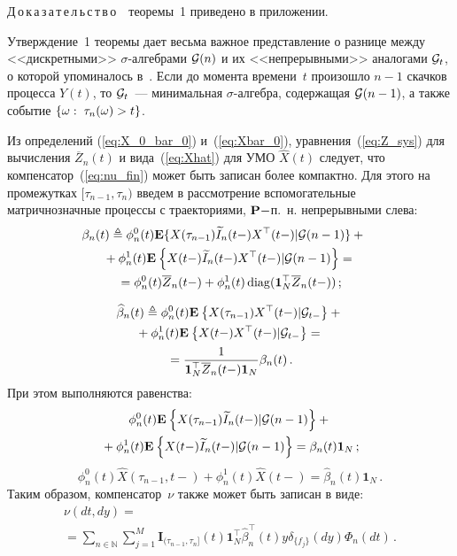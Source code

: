 \begin{multicols}{2}
\noindent
 Д\,о\,к\,а\,з\,а\,т\,е\,л\,ь\,с\,т\,в\,о\ \ теоремы~1 приведено в приложении.

\smallskip

 Утверждение~1 теоремы дает весьма важное пред\-ставление о разнице между
 <<дискретными>> \mbox{$\sigma$-ал}\-геб\-ра\-ми ${\mathcal G}(n)$ и их <<непрерывными>> аналогами
 ${\mathcal G}_t$, о которой упоминалось в~\cite{CLR_06}. Если до момента времени~$t$
 произошло $n-1$ скачков процесса $Y(t)$, то ${\mathcal G}_t$~---
 минимальная $\sigma$-ал\-геб\-ра, содержащая ${\mathcal G}(n-1)$, а также событие
 $\{\omega:\; \tau_n(\omega)\hm>t\}$.

 Из определений (\ref{eq:X_0_bar_0}) и~(\ref{eq:Xbar_0}),
 уравнения~(\ref{eq:Z_sys}) для вычисления $\overline{Z}_n(t)$ и
 вида~(\ref{eq:Xhat}) для УМО $\widehat{X}(t)$ следует, что
 компенсатор~(\ref{eq:nu_fin}) может быть записан более компактно. Для этого
на промежутках $[\tau_{n-1},\tau_n)$ введем в рассмотрение вспомогательные
матричнозначные процессы с траекториями, ${\mathbf P}-$п.~н. непрерывными слева:
 \begin{multline}
 \hspace*{-9pt}\beta_n(t) \triangleq \phi^0_n(t)\mathbf{E}\{X(\tau_{n-1})
 \widetilde{I}_{n}(t-)X^{\top}(t-)|{\mathcal G}(n-1)\}+{}\\
{} +\phi^1_n(t)\mathbf{E}_{  }\left\{ \mathop{X(t-)\widetilde{I}_{n}(t-)X^{\top}(t-)|{\mathcal G}(n-1)} \right\}={} \\
{}=
 \phi^0_n(t)\overline{Z}_n(t-)+\phi^1_n(t)\mathop{\mathrm{diag}}(\mathbf{1}_N^{\top}\overline{Z}_n(t-))\,;
 \label{eq:beta}
 \end{multline}

\vspace*{-12pt}

\noindent
 \begin{multline}
 \widehat{\beta}_n(t) \triangleq \phi^0_n(t)\mathbf{E}_{  }\left\{ \mathop{X(\tau_{n-1})X^{\top}(t-)|{\mathcal G}_{t-}} \right\}+{}\\
 {}+
 \phi^1_n(t)\mathbf{E}_{  }\left\{ \mathop{X(t-)X^{\top}(t-)|{\mathcal G}_{t-}} \right\} ={}\\
 {}=\displaystyle\frac{\displaystyle 1\mathstrut}{\displaystyle \mathbf{1}_N^{\top} \overline{Z}_n(t-)\mathbf{1}_N\mathstrut} \beta_n(t)\,.
 \label{eq:hatbeta}
 \end{multline}
  При этом выполняются равенства:
\begin{multline*}
\phi^0_n(t)\mathbf{E}_{  }\left\{ \mathop{X(\tau_{n-1})\widetilde{I}_{n}(t-)|{\mathcal G}(n-1)} \right\}+{}\\
{}+
\phi^1_n(t)\mathbf{E}_{  }\left\{ \mathop{X(t-)\widetilde{I}_{n}(t-)|{\mathcal G}(n-1)} \right\}=
\beta_n(t)\mathbf{1}_N\,;
\end{multline*}
  $$
\phi^0_n(t)\widehat{X}(\tau_{n-1},t-)+\phi^1_n(t)\widehat{X}(t-)=
\widehat{\beta}_n(t)\mathbf{1}_N\,.
$$
 Таким образом, компенсатор~$\nu$ также может быть записан в виде:
 \begin{multline*}
 \nu(dt,dy) = {}\\
 {}=\sum\limits_{n \in \mathbb{N}}
 \sum\limits_{j=1}^M \mathbf{I}_{(\tau_{n-1},\tau_n]}(t)
 \mathbf{1}_N^{\top}\widehat{\beta}^{\top}_n(t)y \delta_{\{f_j\}}(dy)\Phi_n(dt)\,.
 \end{multline*}


\end{multicols}
